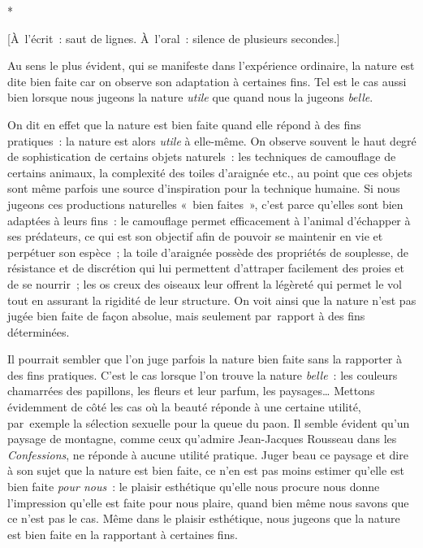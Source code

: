 \documentclass[a4paper,12pt]{report}
\begin{document}
\begin{center}
*

[À l'écrit : saut de lignes. À l'oral : silence de plusieurs secondes.]
\end{center}

Au sens le plus évident, qui se manifeste dans
l'expérience ordinaire, la nature est dite bien faite car on observe son
adaptation à certaines fins. Tel est le cas aussi bien lorsque nous
jugeons la nature \emph{utile} que quand nous la jugeons \emph{belle}​.

On dit en effet que la nature est bien faite
quand elle répond à des fins pratiques : la nature est alors \emph{utile}​ à
elle-même. On observe souvent le haut degré de sophistication de
certains objets naturels : les techniques de
camouflage de certains animaux, la complexité des toiles d'araignée
etc., au point que ces objets sont même parfois une source d'inspiration
pour la technique humaine. Si nous jugeons ces productions naturelles
« bien faites », c'est parce qu'elles sont bien adaptées à leurs fins :
le camouflage permet efficacement à l'animal d'échapper à ses
prédateurs, ce qui est son objectif afin de pouvoir se maintenir en vie
et perpétuer son espèce ; la toile d'araignée possède des propriétés de
souplesse, de résistance et de discrétion qui lui permettent d'attraper
facilement des proies et de se nourrir ; les os creux des oiseaux leur
offrent la légèreté qui permet le vol tout en assurant la rigidité de
leur structure. On voit ainsi que
la nature n'est pas jugée bien faite de façon absolue, mais seulement
par rapport à des fins déterminées.

Il pourrait sembler que l'on juge parfois la
nature bien faite sans la rapporter à des fins pratiques. C'est le cas
lorsque l'on trouve la nature \emph{belle}​ : les couleurs
chamarrées des papillons, les fleurs et leur parfum, les paysages\ldots{}
Mettons évidemment de côté les cas où la beauté réponde à une certaine
utilité, par exemple la sélection sexuelle pour la queue du paon. Il
semble évident qu'un paysage de montagne, comme ceux qu'admire
Jean-Jacques Rousseau dans les \emph{Confessions}​, ne réponde à aucune
utilité pratique. Juger beau ce paysage et dire à son sujet que la
nature est bien faite, ce n'en est pas moins estimer qu'elle est bien
faite \emph{pour nous}​ : le plaisir esthétique qu'elle nous procure nous
donne l'impression qu'elle est faite pour nous plaire, quand bien même
nous savons que ce n'est pas le cas. Même dans le plaisir
esthétique, nous jugeons que la nature est bien
faite en la rapportant à certaines fins.
\end{document}
